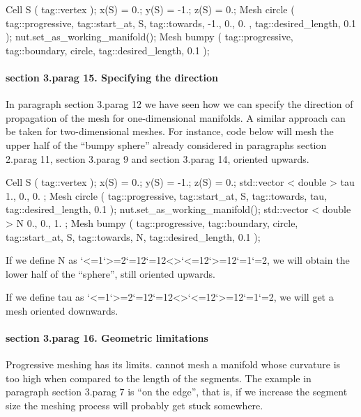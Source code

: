 \verbatim
   Cell S ( tag::vertex );    x(S) =  0.;  y(S) = -1.;  z(S) =  0.;
   Mesh circle ( tag::progressive, tag::start_at, S, tag::towards, { -1., 0., 0. },
                 tag::desired_length, 0.1                                           );
   nut.set_as_working_manifold();
   Mesh bumpy ( tag::progressive, tag::boundary, circle, tag::desired_length, 0.1 );
\endverbatim


\paragraph{\numb section 3.\numb parag 15. Specifying the direction}

In paragraph \numb section 3.\numb parag 12 we have seen how we can specify the direction
of propagation of the mesh for one-dimensional manifolds.
A similar approach can be taken for two-dimensional meshes.
For instance, code below will mesh the upper half of the ``bumpy sphere'' already considered
in paragraphs \numb section 2.\numb parag 11, \numb section 3.\numb parag 9 and
\numb section 3.\numb parag 14, oriented upwards.

\verbatim
   Cell S ( tag::vertex );    x(S) =  0.;  y(S) = -1.;  z(S) =  0.;
   std::vector < double > tau { 1., 0., 0. };
   Mesh circle ( tag::progressive, tag::start_at, S, tag::towards, tau,
                 tag::desired_length, 0.1                               );
   nut.set_as_working_manifold();
   std::vector < double > N { 0., 0., 1. };
   Mesh bumpy ( tag::progressive, tag::boundary, circle,
                tag::start_at, S, tag::towards, N,
                tag::desired_length, 0.1                 );
\endverbatim

If we define {\codett N} as \catcode`<=1\catcode`>=2\catcode`{=12\catcode`}=12<>\catcode`<=12\catcode`>=12\catcode`{=1\catcode`}=2, we will obtain
the lower half of the ``sphere'', still oriented upwards.

If we define {\codett tau} as \catcode`<=1\catcode`>=2\catcode`{=12\catcode`}=12<>\catcode`<=12\catcode`>=12\catcode`{=1\catcode`}=2, we will get a mesh
oriented downwards.


\paragraph{\numb section 3.\numb parag 16. Geometric limitations}

Progressive meshing has its limits.
{\ManiFEM} cannot mesh a manifold whose curvature is too high when compared to the
length of the segments.
The example in paragraph \numb section 3.\numb parag 7 is ``on the edge'', that is,
if we increase the segment size the meshing process will probably get stuck somewhere.


